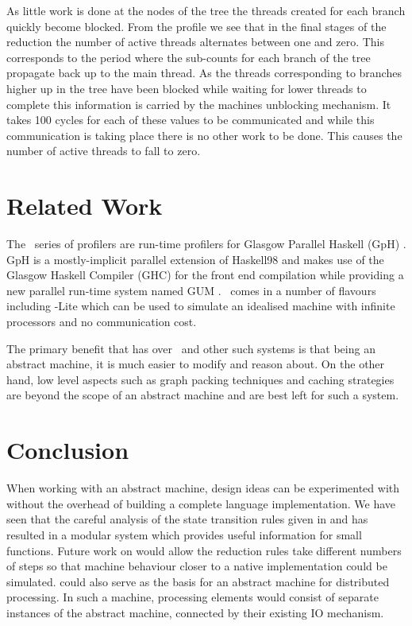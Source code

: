 \documentclass{llncs}
\begin{document}
As little work is done at the nodes of the tree the threads created for each branch quickly become blocked. From the profile we see that in the final stages of the reduction the number of active threads alternates between one and zero. This corresponds to the period where the sub-counts for each branch of the tree propagate back up to the main thread. As the threads corresponding to branches higher up in the tree have been blocked while waiting for lower threads to complete this information is carried by the machines unblocking mechanism. It takes 100 cycles for each of these values to be communicated and while this communication is taking place there is no other work to be done. This causes the number of active threads to fall to zero.

\section{Related Work}
The \gransim\ series of profilers are run-time profilers for Glasgow Parallel Haskell (GpH) \cite{king:stratprof} \cite{loidl:thesis}. GpH is a mostly-implicit parallel extension of Haskell98 and makes use of the Glasgow Haskell Compiler (GHC) for the front end compilation while providing a new parallel run-time system named GUM \cite{gum-ifl}. \gransim\ comes in a number of flavours including \gransim-Lite which can be used to simulate an idealised machine with infinite processors and no communication cost.

The primary benefit that \ample has over \gransim\ and other such systems is that being an abstract machine, \ample it is much easier to modify and reason about. On the other hand, low level aspects such as graph packing techniques and caching strategies are beyond the scope of an abstract machine and are best left for such a system.


\section{Conclusion}
When working with an abstract machine, design ideas can be experimented with without the overhead of building a complete language implementation. We have seen that the careful analysis of the state transition rules given in \cite{baker-finch:sfp99} and \cite{sestoft:abstractmachine} has resulted in a modular system which provides useful information for small functions. Future work on \ample would allow the reduction rules take different numbers of steps so that machine behaviour closer to a native implementation could be simulated. \ample could also serve as the basis for an abstract machine for distributed processing. In such a machine, processing elements would consist of separate instances of the \ample abstract machine, connected by their existing IO mechanism.  
\end{document}
